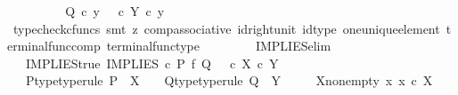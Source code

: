 \begin{isabellebody}
\ \ \ \ \ \ \isamarkupfalse%
\ \isamarkupfalse%
\ {\isachardoublequoteopen}Q\ {\isasymcirc}\isactrlsub c\ y\ {\isacharequal}{\kern0pt}\ {\isacharparenleft}{\kern0pt}{\isasymt}\ {\isasymcirc}\isactrlsub c\ {\isasymbeta}\isactrlbsub Y\isactrlesub {\isacharparenright}{\kern0pt}\ {\isasymcirc}\isactrlsub c\ y{\isachardoublequoteclose}\isanewline
\ \ \ \ \ \ \ \ \isamarkupfalse%
\ {\isacharparenleft}{\kern0pt}typecheck{\isacharunderscore}{\kern0pt}cfuncs{\isacharcomma}{\kern0pt}\ smt\ {\isacharparenleft}{\kern0pt}z{}{\isacharparenright}{\kern0pt}\ comp{\isacharunderscore}{\kern0pt}associative{}\ id{\isacharunderscore}{\kern0pt}right{\isacharunderscore}{\kern0pt}unit{}\ id{\isacharunderscore}{\kern0pt}type\ one{\isacharunderscore}{\kern0pt}unique{\isacharunderscore}{\kern0pt}element\ terminal{\isacharunderscore}{\kern0pt}func{\isacharunderscore}{\kern0pt}comp\ terminal{\isacharunderscore}{\kern0pt}func{\isacharunderscore}{\kern0pt}type{\isacharparenright}{\kern0pt}\isanewline
\ \ \ \ \isamarkupfalse%
\isanewline
\ \ \isamarkupfalse%
\isanewline
{}\isamarkupfalse%
%
\endisatagproof
{\isafoldproof}%
%
\isadelimproof
\isanewline
%
\endisadelimproof
\isanewline
{}\isamarkupfalse%
\ IMPLIES{\isacharunderscore}{\kern0pt}elim{\isacharcolon}{\kern0pt}\isanewline
\ \ \ IMPLIES{\isacharunderscore}{\kern0pt}true{\isacharcolon}{\kern0pt}\ {\isachardoublequoteopen}IMPLIES\ {\isasymcirc}\isactrlsub c\ {\isacharparenleft}{\kern0pt}P\ {\isasymtimes}\isactrlsub f\ Q{\isacharparenright}{\kern0pt}\ {\isacharequal}{\kern0pt}\ {\isasymt}\ {\isasymcirc}\isactrlsub c\ {\isasymbeta}\isactrlbsub X\ {\isasymtimes}\isactrlsub c\ Y\isactrlesub {\isachardoublequoteclose}\isanewline
\ \ \ P{\isacharunderscore}{\kern0pt}type{\isacharbrackleft}{\kern0pt}type{\isacharunderscore}{\kern0pt}rule{\isacharbrackright}{\kern0pt}{\isacharcolon}{\kern0pt}\ {\isachardoublequoteopen}P\ {\isacharcolon}{\kern0pt}\ X\ {\isasymrightarrow}\ {\isasymOmega}{\isachardoublequoteclose}\ \ Q{\isacharunderscore}{\kern0pt}type{\isacharbrackleft}{\kern0pt}type{\isacharunderscore}{\kern0pt}rule{\isacharbrackright}{\kern0pt}{\isacharcolon}{\kern0pt}\ {\isachardoublequoteopen}Q\ {\isacharcolon}{\kern0pt}\ Y\ {\isasymrightarrow}\ {\isasymOmega}{\isachardoublequoteclose}\isanewline
\ \ \ X{\isacharunderscore}{\kern0pt}nonempty{\isacharcolon}{\kern0pt}\ {\isachardoublequoteopen}{\isasymexists}x{\isachardot}{\kern0pt}\ x\ {\isasymin}\isactrlsub c\ X{\isachardoublequoteclose}\isanewline

\end{isabellebody}
